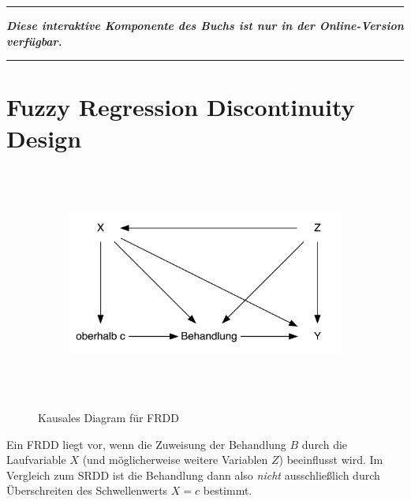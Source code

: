\documentclass[
  a4paper,
  DIV=11,
  oneside]{scrreprt}
\begin{document}
\begin{center}\rule{0.5\linewidth}{0.5pt}\end{center}

\textbf{\emph{Diese interaktive Komponente des Buchs ist nur in der
Online-Version verfügbar.}}

\begin{center}\rule{0.5\linewidth}{0.5pt}\end{center}

\hypertarget{fuzzy-regression-discontinuity-design}{%
\section{Fuzzy Regression Discontinuity
Design}\label{fuzzy-regression-discontinuity-design}}

\begin{figure}

{\centering 

\begin{figure}[H]

{\centering \includegraphics[width=5in,height=3in]{RDD_files/figure-latex/dot-figure-2.png}

}

\end{figure}

}

\caption{\label{fig-CDFRDD}Kausales Diagram für FRDD}

\end{figure}

Ein FRDD liegt vor, wenn die Zuweisung der Behandlung \(B\) durch die
Laufvariable \(X\) (und möglicherweise weitere Variablen \(Z\))
beeinflusst wird. Im Vergleich zum SRDD ist die Behandlung dann also
\emph{nicht} ausschließlich durch Überschreiten des Schwellenwerts
\(X = c\) bestimmt.
\end{document}
